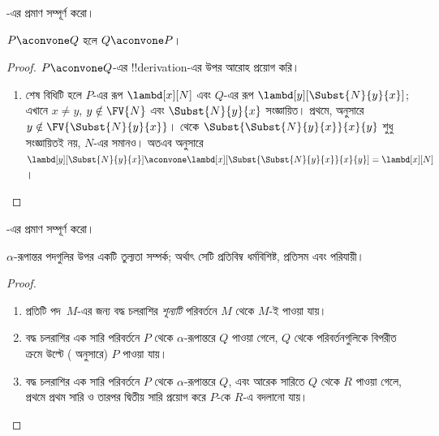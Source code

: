 \documentclass[../../../include/open-logic-section]{subfiles}
\begin{document}
\begin{prob}
  -এর প্রমাণ সম্পূর্ণ করো।
\end{prob}

\begin{lem}
  $P \aconvone Q$ হলে $Q \aconvone P$।
\end{lem}

\begin{proof}
  $P \aconvone Q$-এর !!{derivation}-এর উপর আরোহ প্রয়োগ করি।
  \begin{enumerate}
  \item শেষ বিধিটি  হলে $P$-এর রূপ
    $\lambd[x][N]$ এবং $Q$-এর রূপ
    $\lambd[y][\Subst{N}{y}{x}]$; এখানে $x \neq y$,
    $y \notin \FV{N}$ এবং $\Subst{N}{y}{x}$ সংজ্ঞায়িত। প্রথমে,
     অনুসারে
    $y \notin \FV{\Subst{N}{y}{x}}$।  থেকে
    $\Subst{\Subst{N}{y}{x}}{x}{y}$ শুধু সংজ্ঞায়িতই নয়,
    $N$-এর সমানও। অতএব  অনুসারে
    $\lambd[y][\Subst{N}{y}{x}]
    \aconvone \lambd[x][\Subst{\Subst{N}{y}{x}}{x}{y}] =
    \lambd[x][N]$।
  \end{enumerate}
\end{proof}

\begin{prob}
  -এর প্রমাণ সম্পূর্ণ করো।
\end{prob}

\begin{thm}
  $\alpha$-রূপান্তর পদগুলির উপর একটি তুল্যতা সম্পর্ক; অর্থাৎ সেটি
  প্রতিবিম্ব ধর্মবিশিষ্ট, প্রতিসম এবং পরিযায়ী।
\end{thm}

\begin{proof}
  \begin{enumerate}
  \item প্রতিটি পদ~$M$-এর জন্য বদ্ধ চলরাশির \emph{শূন্যটি} পরিবর্তনে
    $M$ থেকে $M$-ই পাওয়া যায়।
  \item বদ্ধ চলরাশির এক সারি পরিবর্তনে $P$ থেকে $\alpha$-রূপান্তরে
    $Q$ পাওয়া গেলে, $Q$ থেকে পরিবর্তনগুলিকে বিপরীত ক্রমে উল্টে
    ( অনুসারে) $P$ পাওয়া যায়।
  \item বদ্ধ চলরাশির এক সারি পরিবর্তনে $P$ থেকে $\alpha$-রূপান্তরে
    $Q$, এবং আরেক সারিতে $Q$ থেকে $R$ পাওয়া গেলে, প্রথমে প্রথম সারি ও
    তারপর দ্বিতীয় সারি প্রয়োগ করে $P$-কে $R$-এ বদলানো যায়।
  \end{enumerate}
\end{proof}
\end{document}

